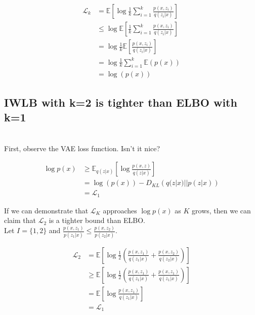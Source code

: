 \documentclass{amsart}
\numberwithin{equation}{section}
\theoremstyle{definition}
\theoremstyle{remark}
\begin{document}
\begin{equation}
\begin{split}
\mathcal{L}_k&= \mathbb{E}\left[\log \frac{1}{k} \sum_{i=1}^k \frac{p(x,z_i)}{q(z_i|x)} \right] \\
&\leq \log \mathbb{E }\left[\frac{1}{k}\sum_{i=1}^k \frac{p(x,z_i)}{q(z_i|x)} \right]\\
&= \log \frac{1}{k}\mathbb{E}\left[ \frac{p(x,z_i)}{q(z_i|x)}\right]\\
&= \log \frac{1}{k} \sum_{i=1}^k \mathbb{E} (p(x))\\
&= \log (p(x))
\end{split}
\end{equation}

\subsection{IWLB with k=2 is tighter than ELBO with k=1} \\

First, observe the VAE loss function. Isn't it nice?

\begin{equation}
\begin{split}
\log p(x) &\geq \mathbb{E}_{q(z|x)} \left[\log \frac{p(x,z)}{q(z|x)} \right]\\
&= \log (p(x))- D_{KL} \left(q(z|x)|| p(z|x) \right)\\
&= \mathcal{L}_1
\end{split}
\end{equation}

If we can demonstrate that $\mathcal{L}_K$ approaches $\log p(x)$ as $K$ grows, then we can claim that $\mathcal{L}_2$ is a tighter bound than ELBO. \\

Let $I= \{1,2\}$ and $\frac{p(x,z_1)}{p(z_1|x)} \leq \frac{p(x,z_2)}{p(z_2|x)}$.

\begin{equation}
\begin{split}
\mathcal{L}_2&= \mathbb{E} \left[\log  \frac{1}{2}\left(\frac{p(x,z_1)}{q(z_1|x)}+\frac{p(x,z_2)}{q(z_2|x)}\right)\right]\\
&\geq  \mathbb{E} \left[\log  \frac{1}{2}\left(\frac{p(x,z_1)}{q(z_1|x)}+\frac{p(x,z_1)}{q(z_1|x)}\right)\right]\\
&= \mathbb{E} \left[\log \frac{p(x,z_1)}{q(z_1|x)}\right]\\
&= \mathcal{L}_1
\end{split}
\end{equation}
\end{document}
